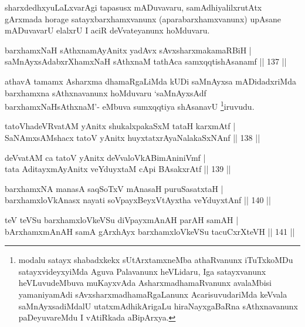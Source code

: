 \begin{artha}
sharxdedhxyuLaLxvarAgi tapasusx mADuvavaru, samAdhiyalilxrutAtx
gArxmada horage satayxbarxhamxvanunx (aparabarxhamxvanunx) upAsane
mADuvavarU elalxrU I aciR deVvateyanunx hoMduvaru.
\end{artha}


\begin{shl}
barxhamxNaH sAthxnamAyAnitx yadAvx sAvxsharxmakamaRBiH | \\
saMnAyxsAdabxrXhamxNaH sAthxnaM tathAca samxqqtishAsanamf \hfill|| 137 || 
\end{shl}

\begin{artha}
athavA tamamx Asharxma dhamaRgaLiMda kUDi saMnAyxsa mADidadxriMda
barxhamxna sAthxnavanunx hoMduvaru `saMnAyxsAdf barxhamxNaHsAthxnaM'- eMbuva sumxqqtiya
shAsanavU \footnote{modalu satayx shabadxkekx sUtArxtamxneMba
  athaRvanunx iTuTxkoMDu satayxvideyxyiMda Aguva Palavanunx heVLidaru,
Iga satayxvanunx heVLuvudeMbuva muKayxvAda AsharxmadhamaRvanunx
avalaMbisi yamaniyamAdi sAvxsharxmadhamaRgaLanunx AcarisuvudariMda
keVvala saMnAyxsadiMdalU utatxmAdhikArigaLu hiraNayxgaBaRna
sAthxnavanunx paDeyuvareMdu I vAtiRkada aBipArxya.}iruvudu.
\end{artha}



\begin{shl}
tatoV\s hadeVRvatAM yAnitx shukalxpakaSxM tataH karxmAtf | \\
SaNAmxsAMshacx tatoV yAnitx huyxtatxrAyaNalakaSxNAnf \hfill|| 138 || 
\end{shl}

\begin{shl}
deVvatAM ca tatoV yAnitx deVvaloVkABimAniniVmf | \\
tata AditayxmAyAnitx veYduyxtaM cApi BAsakxrAtf \hfill|| 139 || 
\end{shl}

\begin{shl}
barxhamxNA manasA saqSoTxV mAnasaH puruSasatxtaH | \\
barxhamxloVkAnasx nayati soV\s payxBeyxVtAyxtha veYduyxtAnf \hfill|| 140 || 
\end{shl}

\begin{shl}
teV teVSu barxhamxloVkeVSu diVpayxmAnAH parAH samAH | \\
bArxhamxmAnAH samA gArxhAyx barxhamxloVkeVSu tacuCxrXteVH \hfill|| 141 || 
\end{shl}

